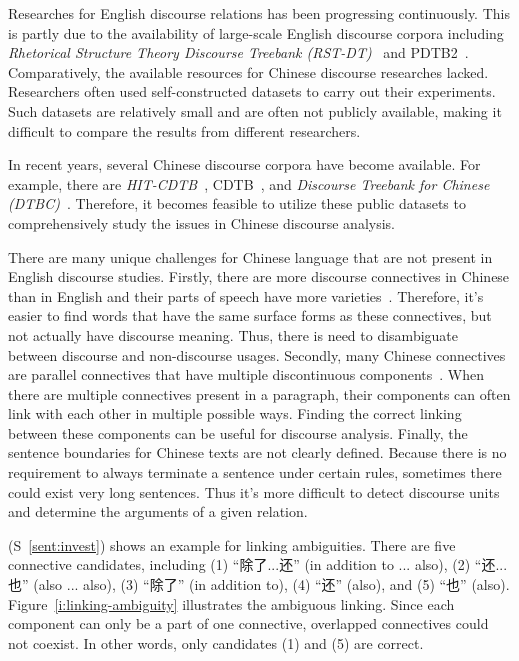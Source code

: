 Researches for English discourse relations has been progressing continuously. This is
partly due to the availability of large-scale English discourse corpora including
\textit{Rhetorical Structure Theory Discourse Treebank (RST-DT)}~\citep{Carlson01building}
and PDTB2~\citep{Prasad08thepenn}. Comparatively, the available resources for Chinese discourse
researches lacked. Researchers often used self-constructed datasets to carry
out their experiments. Such datasets are relatively small and are often not publicly
available, making it difficult to compare the results from different researchers.

In recent years, several Chinese discourse corpora have become available. For example,
there are \textit{HIT-CDTB}~\citep{zhang2014chinese}, CDTB~\citep{li2014building}, and
\textit{Discourse Treebank for Chinese (DTBC)}~\citep{zhou2014the}. Therefore, it
becomes feasible to utilize these public datasets to comprehensively study
the issues in Chinese discourse analysis.

There are many unique challenges for Chinese language that are not present in
English discourse studies. Firstly, there are more discourse connectives
in Chinese than in English and their parts of speech have more
varieties~\citep{huang2014interpretation}. Therefore, it's easier to find words
that have the same surface forms as these connectives, but not actually have
discourse meaning. Thus, there is need to disambiguate between
discourse and non-discourse usages.
Secondly, many Chinese connectives are parallel connectives that
have multiple discontinuous components~\citep{zhou2012pdtb}.
When there are multiple connectives present in a paragraph, their components
can often link with each other in multiple possible ways.
Finding the correct linking between these components
can be useful for discourse analysis. Finally, the sentence boundaries for
Chinese texts are not clearly defined. Because there is no
requirement to always terminate a sentence under certain rules,
sometimes there could exist very long sentences. Thus it's more difficult
to detect discourse units and determine the arguments of a given relation.

(S~\ref{sent:invest}) shows an example for linking ambiguities.
There are five connective candidates, including (1) ``除了...还''
(in addition to ... also), (2) ``还...也'' (also ... also),
(3) ``除了'' (in addition to), (4) ``还'' (also), and (5) ``也'' (also).
Figure~\ref{i:linking-ambiguity} illustrates the ambiguous linking. Since each
component can only be a part of one connective, overlapped connectives could
not coexist.  In other words, only candidates (1) and (5) are correct.

